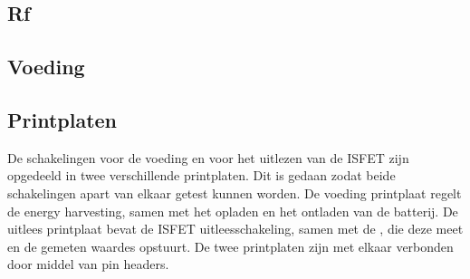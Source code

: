 \subsection{Rf}


\subsection{Voeding}

\subsection{Printplaten}
De schakelingen voor de voeding en voor het uitlezen van de ISFET zijn opgedeeld in twee verschillende printplaten. Dit is gedaan zodat beide schakelingen apart van elkaar getest kunnen worden. De voeding printplaat regelt de energy harvesting, samen met het opladen en het ontladen van de batterij. De uitlees printplaat bevat de ISFET uitleesschakeling, samen met de \mcu, die deze meet en de gemeten waardes opstuurt. De twee printplaten zijn met elkaar verbonden door middel van pin headers.